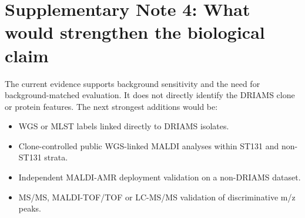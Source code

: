 \documentclass[11pt]{article}
\begin{document}
\section*{Supplementary Note 4: What would strengthen the biological claim}

The current evidence supports background sensitivity and the need for background-matched evaluation. It does not directly identify the DRIAMS clone or protein features. The next strongest additions would be:

\begin{itemize}
  \item WGS or MLST labels linked directly to DRIAMS isolates.
  \item Clone-controlled public WGS-linked MALDI analyses within ST131 and non-ST131 strata.
  \item Independent MALDI-AMR deployment validation on a non-DRIAMS dataset.
  \item MS/MS, MALDI-TOF/TOF or LC-MS/MS validation of discriminative m/z peaks.
\end{itemize}
\end{document}
